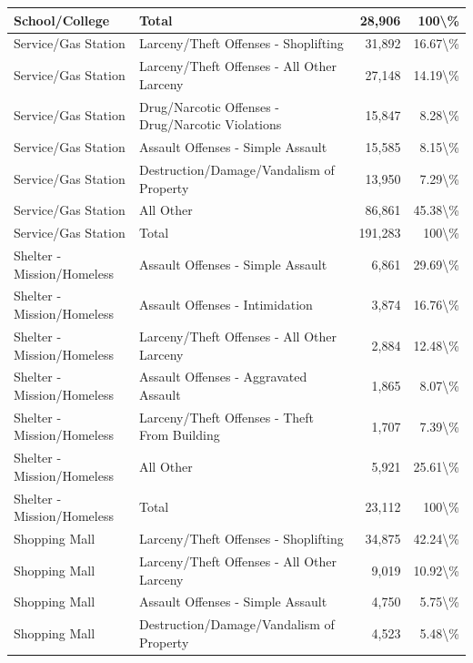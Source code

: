 \documentclass[
]{krantz}
\begin{document}
\begin{longtable}[t]{l|l|r|r}
\hline
School/College & Total & 28,906 & 100\textbackslash{}\%\\
\hline
Service/Gas Station & Larceny/Theft Offenses - Shoplifting & 31,892 & 16.67\textbackslash{}\%\\
\hline
Service/Gas Station & Larceny/Theft Offenses - All Other Larceny & 27,148 & 14.19\textbackslash{}\%\\
\hline
Service/Gas Station & Drug/Narcotic Offenses - Drug/Narcotic Violations & 15,847 & 8.28\textbackslash{}\%\\
\hline
Service/Gas Station & Assault Offenses - Simple Assault & 15,585 & 8.15\textbackslash{}\%\\
\hline
Service/Gas Station & Destruction/Damage/Vandalism of Property & 13,950 & 7.29\textbackslash{}\%\\
\hline
Service/Gas Station & All Other & 86,861 & 45.38\textbackslash{}\%\\
\hline
Service/Gas Station & Total & 191,283 & 100\textbackslash{}\%\\
\hline
Shelter - Mission/Homeless & Assault Offenses - Simple Assault & 6,861 & 29.69\textbackslash{}\%\\
\hline
Shelter - Mission/Homeless & Assault Offenses - Intimidation & 3,874 & 16.76\textbackslash{}\%\\
\hline
Shelter - Mission/Homeless & Larceny/Theft Offenses - All Other Larceny & 2,884 & 12.48\textbackslash{}\%\\
\hline
Shelter - Mission/Homeless & Assault Offenses - Aggravated Assault & 1,865 & 8.07\textbackslash{}\%\\
\hline
Shelter - Mission/Homeless & Larceny/Theft Offenses - Theft From Building & 1,707 & 7.39\textbackslash{}\%\\
\hline
Shelter - Mission/Homeless & All Other & 5,921 & 25.61\textbackslash{}\%\\
\hline
Shelter - Mission/Homeless & Total & 23,112 & 100\textbackslash{}\%\\
\hline
Shopping Mall & Larceny/Theft Offenses - Shoplifting & 34,875 & 42.24\textbackslash{}\%\\
\hline
Shopping Mall & Larceny/Theft Offenses - All Other Larceny & 9,019 & 10.92\textbackslash{}\%\\
\hline
Shopping Mall & Assault Offenses - Simple Assault & 4,750 & 5.75\textbackslash{}\%\\
\hline
Shopping Mall & Destruction/Damage/Vandalism of Property & 4,523 & 5.48\textbackslash{}\%\\

\end{longtable}
\end{document}
